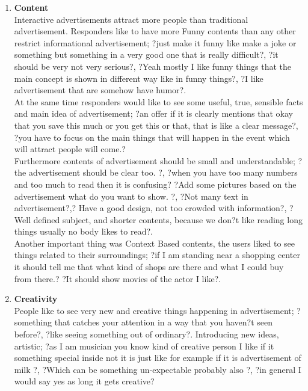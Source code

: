 \begin{enumerate}
\item \textbf{Content} \\
Interactive advertisements attract more people than traditional advertisement.
Responders like to have more Funny contents than any other restrict informational advertisement; ?just make it funny like make a joke or something but something in a very good one that is really difficult?, ?it should be very not very serious?, ?Yeah mostly I like funny things that the main concept is shown in different way like in funny things?, ?I like advertisement that are somehow have humor?. 	 \\

At the same time responders would like to see some useful, true, sensible facts and main idea of advertisement; ?an offer if it is clearly mentions that okay that you save this much or you get this or that, that is like a clear message?,  ?you have to focus on the main things that will happen in the event which will attract people will come.? \\

Furthermore contents of advertisement should be small and understandable; ?the advertisement should be clear too. ?, ?when you have too many numbers and too much to read then it is confusing?  ?Add some pictures based on the advertisement what do you want to show. ?, ?Not many text in advertisement?,? Have a good design, not too crowded with information?, ?Well defined subject, and shorter contents, because we don?t like reading long things usually no  body likes to read?.  \\

Another important thing was Context Based contents, the users liked to see things related to their surroundings; ?if I am standing near a shopping center it should tell me that what kind of shops are there and what I could buy from there.?  ?It should show movies of the actor I like?. \\
		
		
\item \textbf{Creativity} \\	
People like to see very new and creative things happening in advertisement; ?something that catches your attention in a way that you haven?t seen before?, ?like seeing something out of ordinary?. Introducing new ideas, artistic; ?as I am musician you know kind of creative person I like if it something special inside not it is just like for example if it is advertisement of milk ?, ?Which can be something un-expectable probably also ?, ?in general I would say yes as long it gets creative?



\end{enumerate}
